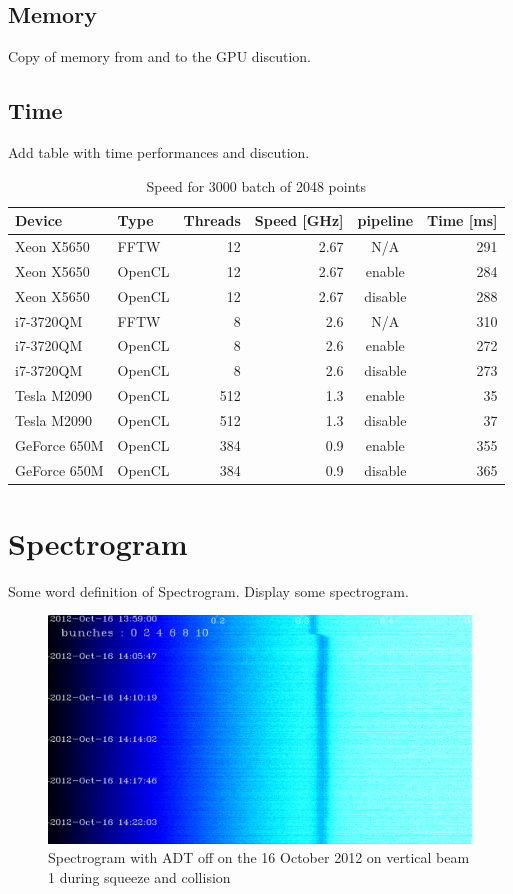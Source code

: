    \subsection{Memory}

	Copy of memory from and to the GPU discution.

   \subsection{Time}

	Add table with time performances and discution.

	\begin{table}[H]
		\caption{Speed for 3000 batch of 2048 points}
		\begin{tabular}{|l|lrrcr|}
			\hline
				Device & Type & Threads & Speed [GHz] & pipeline & Time [ms] \\
			\hline
			\hline
				Xeon X5650 & FFTW & 12 & 2.67 & N/A & 291 \\
				Xeon X5650 & OpenCL & 12 & 2.67 & enable & 284 \\
				Xeon X5650 & OpenCL & 12 & 2.67 & disable & 288 \\
			\hline
				i7-3720QM & FFTW & 8 & 2.6 & N/A & 310 \\
				i7-3720QM & OpenCL & 8 & 2.6 & enable & 272 \\
				i7-3720QM & OpenCL & 8 & 2.6 & disable & 273 \\
			\hline
			\hline
				Tesla M2090 & OpenCL & 512 & 1.3 & enable & 35 \\
				Tesla M2090 & OpenCL & 512 & 1.3 & disable & 37 \\
			\hline
				GeForce 650M & OpenCL & 384 & 0.9 & enable & 355 \\
				GeForce 650M & OpenCL & 384 & 0.9 & disable & 365 \\
			\hline
		\end{tabular}
	\end{table}

\section{Spectrogram}

Some word definition of Spectrogram. Display some spectrogram.

\begin{figure}[H]
	\caption{Spectrogram with ADT off on the 16 October 2012 on vertical beam 1 during squeeze and collision}
	\centering
	\includegraphics[scale=0.3]{md-121016-vb1-m1-6bunches-10acc-1359-1425-collision.pdf}
\end{figure}